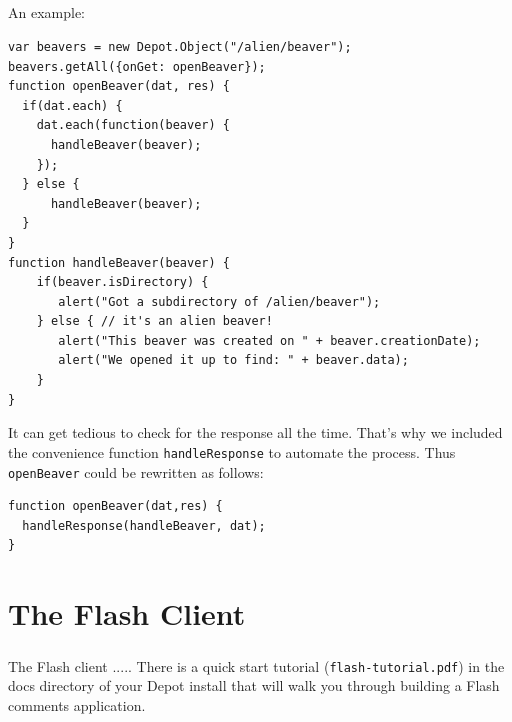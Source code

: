 \documentclass{report}
\begin{document}

\paragraph{}
An example:

\begin{Verbatim}[frame=single]
var beavers = new Depot.Object("/alien/beaver");
beavers.getAll({onGet: openBeaver});
function openBeaver(dat, res) {
  if(dat.each) {
    dat.each(function(beaver) {
      handleBeaver(beaver);
    });
  } else {
      handleBeaver(beaver);
  }
}
function handleBeaver(beaver) {
    if(beaver.isDirectory) {
       alert("Got a subdirectory of /alien/beaver");
    } else { // it's an alien beaver!
       alert("This beaver was created on " + beaver.creationDate);
       alert("We opened it up to find: " + beaver.data);
    } 
}
\end{Verbatim}

It can get tedious to check for the response all the time. That's why
we included the convenience function \texttt{handleResponse} to
automate the process. Thus \texttt{openBeaver} could be rewritten as
follows:

\begin{Verbatim}[frame=single]
function openBeaver(dat,res) {
  handleResponse(handleBeaver, dat);
}
\end{Verbatim}

\chapter{The Flash Client}

\paragraph{}
The Flash client ..... 
 There is a quick start tutorial
(\texttt{flash-tutorial.pdf}) in the docs directory of your Depot
install that will walk you through building a Flash comments application.
\end{document}
